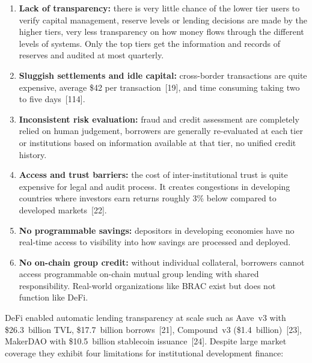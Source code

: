 \documentclass[12pt, a4paper]{report}
\begin{document}
\begin{enumerate}[noitemsep]
\item \textbf{Lack of transparency:} there is very little chance of the lower tier users to verify capital management, reserve levels or lending decisions are made by the higher tiers, very less transparency on how money flows through the different levels of systems. Only the top tiers get the information and records of reserves and audited at most quarterly.
\item \textbf{Sluggish settlements and idle capital:} cross-border transactions are quite expensive, average \$42 per transaction~[19], and time consuming taking two to five days~[114].
\item \textbf{Inconsistent risk evaluation:} fraud and credit assessment are completely relied on human judgement, borrowers are generally re-evaluated at each tier or institutions based on information available at that tier, no unified credit history.
\item \textbf{Access and trust barriers:} the cost of inter-institutional trust is quite expensive for legal and audit process. It creates congestions in developing countries where investors earn returns roughly 3\% below compared to developed markets~[22].
\item \textbf{No programmable savings:} depositors in developing economies have no real-time access to visibility into how savings are processed and deployed.
\item \textbf{No on-chain group credit:} without individual collateral, borrowers cannot access programmable on-chain mutual group lending with shared responsibility. Real-world organizations like BRAC exist but does not function like DeFi.
\end{enumerate}

DeFi enabled automatic lending transparency at scale such as Aave~v3 with \$26.3~billion TVL, \$17.7~billion borrows~[21], Compound~v3 (\$1.4~billion)~[23], MakerDAO with \$10.5~billion stablecoin issuance~[24]. Despite large market coverage they exhibit four limitations for institutional development finance:
\end{document}
